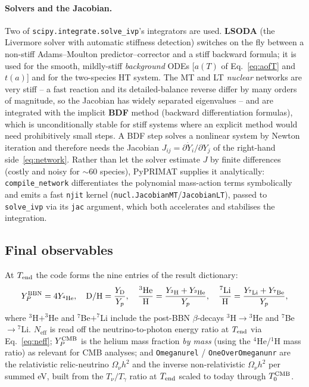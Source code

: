 \documentclass[11pt,a4paper]{article}
\newcommand{\Tg}{T_\gamma}
\newcommand{\Neff}{N_{\mathrm{eff}}}
\newcommand{\YP}{Y_P}
\newcommand{\DoH}{\mathrm{D/H}}
\newcommand{\code}[1]{\texttt{#1}}
\begin{document}
\paragraph{Solvers and the Jacobian.}
Two of \code{scipy.integrate.solve\_ivp}'s integrators are used. \textbf{LSODA}
(the Livermore solver with automatic stiffness detection) switches on the fly
between a non-stiff Adams--Moulton predictor--corrector and a stiff backward
formula; it is used for the smooth, mildly-stiff \emph{background} ODEs
[$a(T)$ of Eq.~\eqref{eq:aofT} and $t(a)$] and for the two-species HT system.
The MT and LT \emph{nuclear} networks are very stiff -- a fast reaction and its
detailed-balance reverse differ by many orders of magnitude, so the Jacobian has
widely separated eigenvalues -- and are integrated with the implicit
\textbf{BDF} method (backward differentiation formulas), which is
unconditionally stable for stiff systems where an explicit method would need
prohibitively small steps. A BDF step solves a nonlinear system by Newton
iteration and therefore needs the Jacobian
$J_{ij}=\partial\dot Y_i/\partial Y_j$ of the right-hand
side~\eqref{eq:network}. Rather than let the solver estimate $J$ by finite
differences (costly and noisy for $\sim$60 species), PyPRIMAT supplies it
analytically: \code{compile\_network} differentiates the polynomial mass-action
terms symbolically and emits a fast \code{njit} kernel
(\code{nucl.JacobianMT}/\code{JacobianLT}), passed to \code{solve\_ivp} via its
\code{jac} argument, which both accelerates and stabilises the integration.

\subsection{Final observables}\label{sec:obs}
At $T_{\rm end}$ the code forms the nine entries of the result dictionary:
\begin{equation}
  \YP^{\rm BBN}=4Y_{^4{\rm He}},\quad
  \DoH=\frac{Y_{\rm D}}{Y_p},\quad
  \frac{^3{\rm He}}{\rm H}=\frac{Y_{^3{\rm H}}+Y_{^3{\rm He}}}{Y_p},\quad
  \frac{^7{\rm Li}}{\rm H}=\frac{Y_{^7{\rm Li}}+Y_{^7{\rm Be}}}{Y_p},
\end{equation}
where $^3$H$+^3$He and $^7$Be$+^7$Li include the post-BBN $\beta$-decays
$^3$H$\to{}^3$He and $^7$Be$\to{}^7$Li. $\Neff$ is read off the
neutrino-to-photon energy ratio at $T_{\rm end}$ via Eq.~\eqref{eq:neff};
$\YP^{\rm CMB}$ is the helium mass fraction \emph{by mass} (using the
$^4$He/$^1$H mass ratio) as relevant for CMB analyses; and \code{Omeganurel} /
\code{OneOverOmeganunr} are the relativistic relic-neutrino $\Omega_\nu h^2$ and
the inverse non-relativistic $\Omega_\nu h^2$ per summed eV, built from the
$T_\nu/\Tg$ ratio at $T_{\rm end}$ scaled to today through $T_0^{\rm CMB}$.
\end{document}
